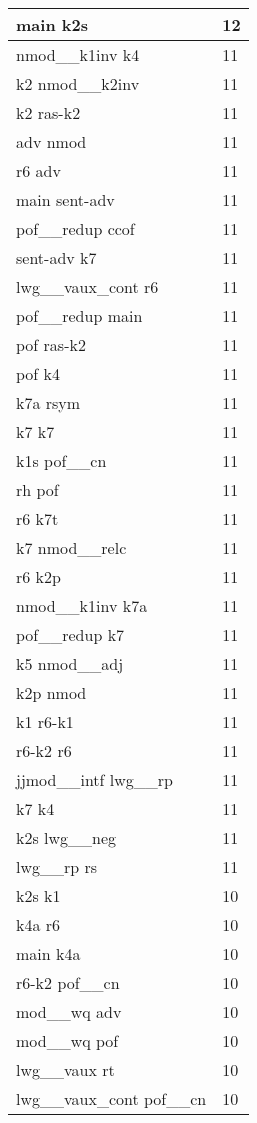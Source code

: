 \documentclass[a4 paper]{article}
\begin{document}
\begin{longtable}{p{}p{}}
main k2s  & 12 \\ \midrule
nmod\_\_k1inv k4  & 11 \\ \midrule
k2 nmod\_\_k2inv  & 11 \\ \midrule
k2 ras-k2  & 11 \\ \midrule
adv nmod  & 11 \\ \midrule
r6 adv  & 11 \\ \midrule
main sent-adv  & 11 \\ \midrule
pof\_\_redup ccof  & 11 \\ \midrule
sent-adv k7  & 11 \\ \midrule
lwg\_\_vaux\_cont r6  & 11 \\ \midrule
pof\_\_redup main  & 11 \\ \midrule
pof ras-k2  & 11 \\ \midrule
pof k4  & 11 \\ \midrule
k7a rsym  & 11 \\ \midrule
k7 k7  & 11 \\ \midrule
k1s pof\_\_cn  & 11 \\ \midrule
rh pof  & 11 \\ \midrule
r6 k7t  & 11 \\ \midrule
k7 nmod\_\_relc  & 11 \\ \midrule
r6 k2p  & 11 \\ \midrule
nmod\_\_k1inv k7a  & 11 \\ \midrule
pof\_\_redup k7  & 11 \\ \midrule
k5 nmod\_\_adj  & 11 \\ \midrule
k2p nmod  & 11 \\ \midrule
k1 r6-k1  & 11 \\ \midrule
r6-k2 r6  & 11 \\ \midrule
jjmod\_\_intf lwg\_\_rp  & 11 \\ \midrule
k7 k4  & 11 \\ \midrule
k2s lwg\_\_neg  & 11 \\ \midrule
lwg\_\_rp rs  & 11 \\ \midrule
k2s k1  & 10 \\ \midrule
k4a r6  & 10 \\ \midrule
main k4a  & 10 \\ \midrule
r6-k2 pof\_\_cn  & 10 \\ \midrule
mod\_\_wq adv  & 10 \\ \midrule
mod\_\_wq pof  & 10 \\ \midrule
lwg\_\_vaux rt  & 10 \\ \midrule
lwg\_\_vaux\_cont pof\_\_cn  & 10 \\ \midrule

\end{longtable}
\end{document}
